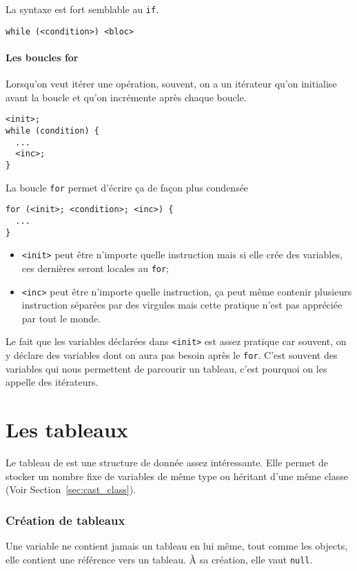 La syntaxe est fort semblable au \lstinline|if|.
\begin{lstlisting}
while (<condition>) <bloc>
\end{lstlisting}

\subsection{Les boucles for}
Lorsqu'on veut itérer une opération, souvent, on a un itérateur qu'on
initialise avant la boucle et qu'on incrémente après chaque boucle.
\begin{lstlisting}
<init>;
while (condition) {
  ...
  <inc>;
}
\end{lstlisting}

La boucle \lstinline|for| permet d'écrire ça de façon plus condensée
\begin{lstlisting}
for (<init>; <condition>; <inc>) {
  ...
}
\end{lstlisting}

\begin{itemize}
  \item \lstinline|<init>| peut être n'importe quelle
    instruction mais si elle crée
    des variables, ces dernières seront locales au \lstinline|for|;
  \item \lstinline|<inc>| peut être n'importe quelle instruction, ça peut même
    contenir plusieurs instruction séparées par des virgules mais cette
    pratique n'est pas appréciée par tout le monde.
\end{itemize}
Le fait que les variables déclarées dans \lstinline|<init>|
est assez pratique car souvent,
on y déclare des variables dont on aura pas besoin après le \lstinline|for|.
C'est souvent des variables qui nous permettent de parcourir un tableau,
c'est pourquoi on les appelle des itérateurs.

\part{Les tableaux}
Le tableau de \java{} est une structure de donnée assez intéressante.
Elle permet de stocker un nombre fixe de variables de même type
ou héritant d'une même classe (Voir Section~\ref{sec:cast_class}).

\section{Création de tableaux}
Une variable ne contient jamais un tableau en lui même,
tout comme les objects, elle contient une référence vers un tableau.
À sa création, elle vaut \lstinline|null|.

